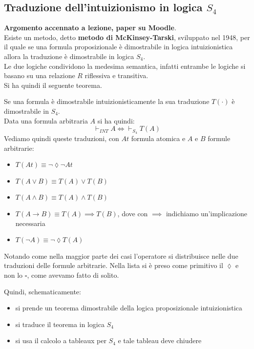 \documentclass[a4paper,12pt, oneside]{book}
\begin{document}
\subsection{Traduzione dell'intuizionismo in logica $S_4$}
\textbf{Argomento accennato a lezione, paper su Moodle}.\\
Esiste un metodo, detto \textbf{metodo di McKinsey-Tarski}, sviluppato nel 1948,
per il quale se una formula proposizionale è dimostrabile in logica
intuizionistica allora la traduzione è dimostrabile in logica $S_4$.\\
Le due logiche condividono la medesima semantica, infatti entrambe le logiche
si basano su una relazione $R$ riflessiva e transitiva.\\
Si ha quindi il seguente teorema.
\begin{teorema}
  Se una formula è dimostrabile intuizionisticamente la sua traduzione
  $T(\cdot)$ è dimostrabile in $S_4$.\\
  Data una formula arbitraria $A$ si ha quindi:
  \[\vdash_{INT}A\iff \vdash_{S_4}T(A)\]
  Vediamo quindi queste traduzioni, con $At$ formula atomica e $A$ e $B$ formule
  arbitrarie: 
  \begin{itemize}
    \item $T(At)\equiv\neg\lozenge\neg At$
    \item $T(A\lor B)\equiv T(A)\lor T(B)$
    \item $T(A\land B)\equiv T(A)\land T(B)$
    \item $T(A\to B)\equiv T(A)\implies T(B)$, dove con $\implies$ indichiamo
    un'implicazione necessaria
    \item $T(\neg A)\equiv \neg \lozenge T(A)$
  \end{itemize}
  Notando come nella maggior parte dei casi l'operatore si distribuisce nelle
  due traduzioni delle formule arbitrarie. Nella lista si è preso come
  primitivo il $\lozenge$ e non lo $\square$, come avevamo fatto di solito.
\end{teorema}
Quindi, schematicamente:
\begin{itemize}
  \item si prende un teorema dimostrabile della logica proposizionale
  intuizionistica 
  \item si traduce il teorema in logica $S_4$
  \item si usa il calcolo a tableaux per $S_4$ e tale tableau deve chiudere
\end{itemize}
\end{document}
